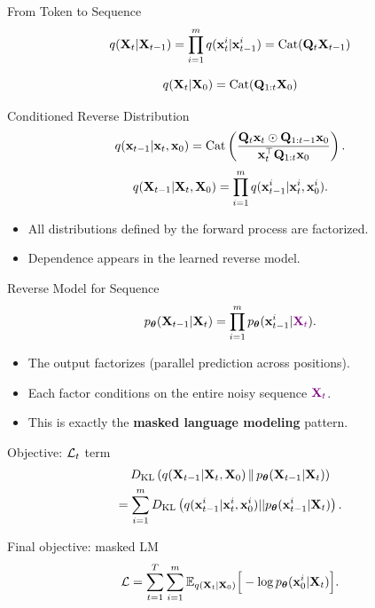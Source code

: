 \documentclass{beamer}
\renewcommand{\eqpause}{}
\begin{document}
\begin{frame}{From Token to Sequence}
    \[
        q(\mathbf{X}_t |\mathbf{X}_{t-1}) =
		\prod_{i=1}^m q(\mathbf{x}_t^i |\mathbf{x}_{t-1}^i) = \operatorname{Cat}(\mathbf{Q}_t \mathbf{X}_{t-1})
    \]
    \eqpause
    \[
        q(\mathbf{X}_t |\mathbf{X}_0) = \operatorname{Cat}(\mathbf{Q}_{1:t} \mathbf{X}_0)
    \]
    \vspace{-0.3cm}
    \eqpause
    \begin{block}{Conditioned Reverse Distribution}
        \[
            q(\mathbf{x}_{t-1} | \mathbf{x}_t, \mathbf{x}_0)
			= \operatorname{Cat}\left(\frac{\mathbf{Q}_t \mathbf{x}_t \odot \mathbf{Q}_{1:t-1} \mathbf{x}_0}{\mathbf{x}_t^{\top}\mathbf{Q}_{1:t}\mathbf{x}_0}\right).
        \]
        \vspace{-0.3cm}
        \[
            q(\mathbf{X}_{t-1} | \mathbf{X}_t, \mathbf{X}_0) =
            \prod_{i=1}^m q(\mathbf{x}_{t-1}^i |\mathbf{x}_t^i, \mathbf{x}_0^i).
        \]
        \vspace{-0.3cm}
    \end{block}
    \eqpause
    \begin{itemize}
        \item All distributions defined by the forward process are factorized.
        \item Dependence appears in the learned reverse model.
    \end{itemize}
\end{frame}
\begin{frame}{Reverse Model for Sequence}
    \[
        p_{\boldsymbol{\theta}}(\mathbf{X}_{t-1}|\mathbf{X}_t) =
		\prod_{i=1}^m p_{\boldsymbol{\theta}}(\mathbf{x}_{t-1}^i | {\color{violet}\mathbf{X}_t}).
    \]
    \vspace{-0.3cm}
    \begin{itemize}
        \item The output factorizes (parallel prediction across positions).
        \item Each factor conditions on the entire noisy sequence ${\color{violet}\mathbf{X}_t}$.
        \item This is exactly the \textbf{masked language modeling} pattern.
    \end{itemize}
    \eqpause
    \begin{block}{Objective: $\mathcal{L}_t$ term}
        \vspace{-0.7cm}
        \begin{multline*}
			D_\mathrm{KL}\left(q(\mathbf{X}_{t-1}| \mathbf{X}_t, \mathbf{X}_0)\,\|\,p_{\boldsymbol{\theta}}(\mathbf{X}_{t-1}| \mathbf{X}_t)\right) \\
			= \sum_{i=1}^m D_\mathrm{KL}\left(q(\mathbf{x}_{t-1}^i|\mathbf{x}_t^i, \mathbf{x}_0^i) || p_{\boldsymbol{\theta}}(\mathbf{x}_{t-1}^i|\mathbf{X}_t)\right).
        \end{multline*}
        \vspace{-0.5cm}
    \end{block}
    \eqpause
    \begin{block}{Final objective: masked LM}
        \vspace{-0.3cm}
        \[
            \mathcal{L} =
            \sum_{t=1}^T \sum_{i=1}^m
            \mathbb{E}_{q(\mathbf{X}_t|\mathbf{X}_0)}
            \Big[-\log p_{\boldsymbol{\theta}}(\mathbf{x}_0^i |\mathbf{X}_t)\Big].
        \]
    \end{block}
\end{frame}
\end{document}
